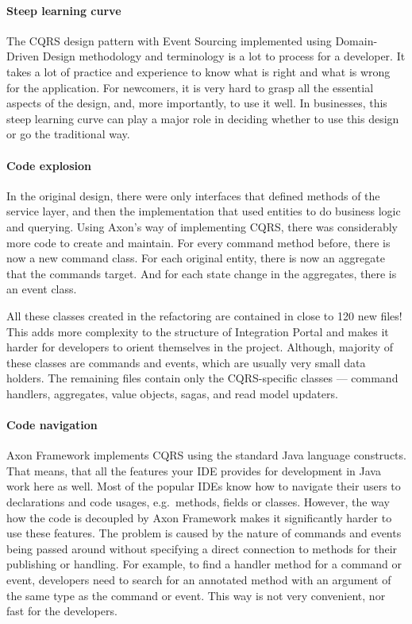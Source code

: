\documentclass{book}
\begin{document}
\paragraph{Steep learning curve}\label{steep-learning-curve}

The CQRS design pattern with Event Sourcing implemented using
Domain-Driven Design methodology and terminology is a lot to process for
a developer. It takes a lot of practice and experience to know what is
right and what is wrong for the application. For newcomers, it is very
hard to grasp all the essential aspects of the design, and, more
importantly, to use it well. In businesses, this steep learning curve
can play a major role in deciding whether to use this design or go the
traditional way.

\paragraph{Code explosion}\label{code-explosion}

In the original design, there were only interfaces that defined methods
of the service layer, and then the implementation that used entities to
do business logic and querying. Using Axon's way of implementing CQRS,
there was considerably more code to create and maintain. For every
command method before, there is now a new command class. For each
original entity, there is now an aggregate that the commands target. And
for each state change in the aggregates, there is an event class.

All these classes created in the refactoring are contained in close to
120 new files! This adds more complexity to the structure of Integration
Portal and makes it harder for developers to orient themselves in the
project. Although, majority of these classes are commands and events,
which are usually very small data holders. The remaining files contain
only the CQRS-specific classes --- command handlers, aggregates, value
objects, sagas, and read model updaters.

\paragraph{Code navigation}\label{code-navigation}

Axon Framework implements CQRS using the standard Java language
constructs. That means, that all the features your IDE provides for
development in Java work here as well. Most of the popular IDEs know how
to navigate their users to declarations and code usages, e.g.~methods,
fields or classes. However, the way how the code is decoupled by Axon
Framework makes it significantly harder to use these features. The
problem is caused by the nature of commands and events being passed
around without specifying a direct connection to methods for their
publishing or handling. For example, to find a handler method for a
command or event, developers need to search for an annotated method with
an argument of the same type as the command or event. This way is not
very convenient, nor fast for the developers.
\end{document}
